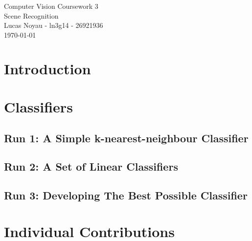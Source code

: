 \documentclass[12pt]{article}
\begin{document}
\begin{center}
{\Large Computer Vision Coursework 3} \\
{\Large Scene Recognition} \\
Lucas Noyau - ln3g14 - 26921936\\
\today
\end{center}


\section{Introduction}


\section{Classifiers}

\subsection{Run 1: A Simple k-nearest-neighbour Classifier}

\subsection{Run 2: A Set of Linear Classifiers}

\subsection{Run 3: Developing The Best Possible Classifier}


\section{Individual Contributions}
\end{document}

